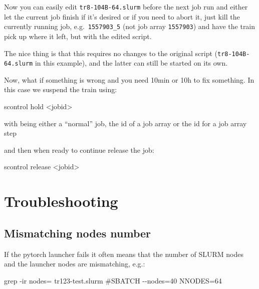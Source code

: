 \documentclass[
]{report}
\newenvironment{Shaded}{\begin{snugshade}}{\end{snugshade}}
\newcommand{\AttributeTok}[1]{\textcolor[rgb]{0.40,0.45,0.13}{#1}}
\newcommand{\CommentTok}[1]{\textcolor[rgb]{0.37,0.37,0.37}{#1}}
\newcommand{\ExtensionTok}[1]{\textcolor[rgb]{0.00,0.23,0.31}{#1}}
\newcommand{\FunctionTok}[1]{\textcolor[rgb]{0.28,0.35,0.67}{#1}}
\newcommand{\NormalTok}[1]{\textcolor[rgb]{0.00,0.23,0.31}{#1}}
\newcommand{\OperatorTok}[1]{\textcolor[rgb]{0.37,0.37,0.37}{#1}}
\newcommand{\VariableTok}[1]{\textcolor[rgb]{0.07,0.07,0.07}{#1}}
\begin{document}
Now you can easily edit \texttt{tr8-104B-64.slurm} before the next job
run and either let the current job finish if it's desired or if you need
to abort it, just kill the currently running job,
e.g.~\texttt{1557903\_5} (not job array \texttt{1557903}) and have the
train pick up where it left, but with the edited script.

The nice thing is that this requires no changes to the original script
(\texttt{tr8-104B-64.slurm} in this example), and the latter can still
be started on its own.

Now, what if something is wrong and you need 10min or 10h to fix
something. In this case we suspend the train using:

\begin{Shaded}
\begin{Highlighting}[]
\ExtensionTok{scontrol}\NormalTok{ hold }\OperatorTok{\textless{}}\NormalTok{jobid}\OperatorTok{\textgreater{}}
\end{Highlighting}
\end{Shaded}

with being either a ``normal'' job, the id of a job array or the id for
a job array step

and then when ready to continue release the job:

\begin{Shaded}
\begin{Highlighting}[]
\ExtensionTok{scontrol}\NormalTok{ release }\OperatorTok{\textless{}}\NormalTok{jobid}\OperatorTok{\textgreater{}}
\end{Highlighting}
\end{Shaded}

\section{Troubleshooting}\label{troubleshooting}

\subsection{Mismatching nodes number}\label{mismatching-nodes-number}

If the pytorch launcher fails it often means that the number of SLURM
nodes and the launcher nodes are mismatching, e.g.:

\begin{Shaded}
\begin{Highlighting}[]
\FunctionTok{grep} \AttributeTok{{-}ir}\NormalTok{ nodes= tr123{-}test.slurm}
\CommentTok{\#SBATCH {-}{-}nodes=40}
\VariableTok{NNODES}\OperatorTok{=}\NormalTok{64}
\end{Highlighting}
\end{Shaded}
\end{document}
